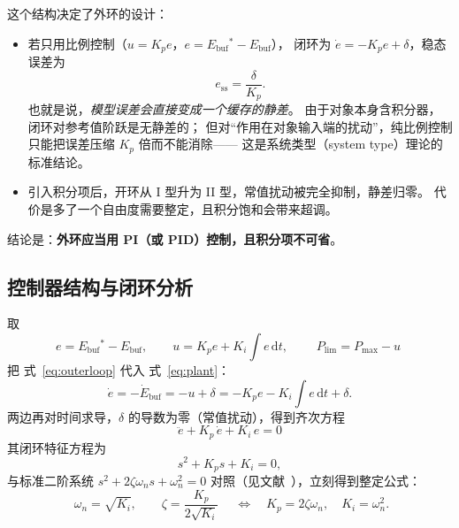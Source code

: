 \documentclass[cn,blue,11pt,device=normal]{elegantnote}
\newcommand{\Ebuf}{E_{\mathrm{buf}}{}}
\newcommand{\Plim}{P_{\mathrm{lim}}{}}
\newcommand{\Pmax}{P_{\max}{}}
\newcommand{\dd}{\mathrm{d}}
\newcommand{\fref}[1]{式~\eqref{#1}}
\begin{document}
这个结构决定了外环的设计：

\begin{itemize}
  \item 若只用比例控制（$u = K_p e$，$e=\Ebuf^{\ast}-\Ebuf$），
  闭环为 $\dot e = -K_p e + \delta$，稳态误差为
  \begin{equation}
    e_{\mathrm{ss}} = \frac{\delta}{K_p} .
  \end{equation}
  也就是说，\emph{模型误差会直接变成一个缓存的静差}。
  由于对象本身含积分器，闭环对参考值阶跃是无静差的；
  但对“作用在对象输入端的扰动”，纯比例控制只能把误差压缩 $K_p$ 倍而不能消除——
  这是系统类型（system type）理论的标准结论。
  \item 引入积分项后，开环从 I 型升为 II 型，常值扰动被完全抑制，静差归零。
  代价是多了一个自由度需要整定，且积分饱和会带来超调。
\end{itemize}

结论是：\textbf{外环应当用 PI（或 PID）控制，且积分项不可省}。

\subsection{控制器结构与闭环分析}

取
\begin{equation}\label{eq:outerloop}
  e = \Ebuf^{\ast} - \Ebuf,
  \qquad
  u = K_p e + K_i\!\int e\,\dd t,
  \qquad
  \boxed{\;\Plim = \Pmax - u\;}
\end{equation}
把 \fref{eq:outerloop} 代入 \fref{eq:plant}：
\begin{equation}
  \dot e = -\dot\Ebuf = -u + \delta = -K_p e - K_i\!\int e\,\dd t + \delta .
\end{equation}
两边再对时间求导，$\delta$ 的导数为零（常值扰动），得到齐次方程
\begin{equation}\label{eq:closedloop}
  \boxed{\;\ddot e + K_p\,\dot e + K_i\,e = 0\;}
\end{equation}
其闭环特征方程为
\begin{equation}\label{eq:chareq}
  s^{2} + K_p s + K_i = 0 ,
\end{equation}
与标准二阶系统 $s^2 + 2\zeta\omega_n s + \omega_n^2 = 0$ 对照（见文献~\cite{franklin2002feedback}），立刻得到整定公式：
\begin{equation}\label{eq:tuning}
  \boxed{\;\omega_n = \sqrt{K_i}, \qquad \zeta = \frac{K_p}{2\sqrt{K_i}}\;}
  \quad\Longleftrightarrow\quad
  K_p = 2\zeta\omega_n,\quad K_i = \omega_n^{2}.
\end{equation}
\end{document}
